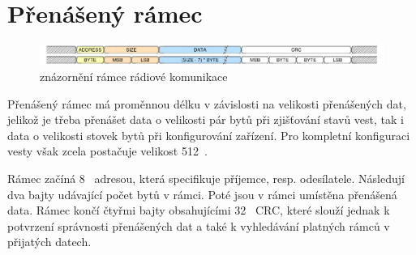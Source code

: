 \section{Přenášený rámec}
\begin{figure}[H]
    \begin{center}
        \includegraphics[width=\textwidth]{img/lgrf_packet}
    \end{center}
    \caption{znázornění rámce rádiové komunikace}
\end{figure}

Přenášený rámec má proměnnou délku v závislosti na velikosti přenášených dat, jelikož je třeba přenášet data o velikosti pár bytů při zjišťování stavů vest, tak i data o velikosti stovek bytů při konfigurování zařízení. Pro kompletní konfiguraci vesty však zcela postačuje velikost 512~.

Rámec začíná 8~ adresou, která specifikuje příjemce, resp. odesílatele. Následují dva bajty udávající počet bytů v rámci. Poté jsou v rámci umístěna přenášená data. Rámec končí čtyřmi bajty obsahujícími 32~ CRC, které slouží jednak k potvrzení správnosti přenášených dat a také k vyhledávání platných rámců v přijatých datech.

